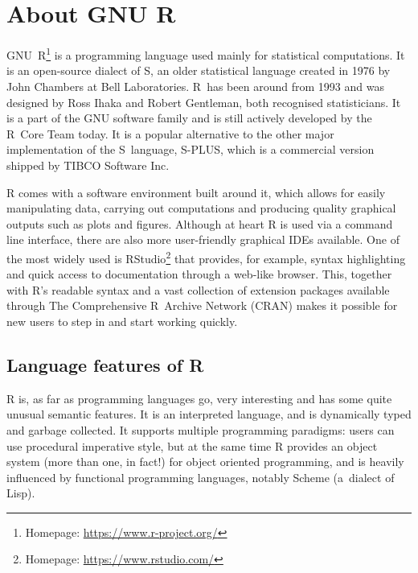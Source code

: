 \chapter{About GNU R\label{gnur}}

GNU~R\footnote{Homepage: \url{https://www.r-project.org/}} is a programming language used mainly for statistical computations. It is an open-source dialect of S, an older statistical language created in 1976 by John Chambers at Bell Laboratories. R~has been around from 1993 and was designed by Ross Ihaka and Robert Gentleman, both recognised statisticians. It is a part of the GNU software family and is still actively developed by the R~Core Team today. It is a popular alternative to the other major implementation of the S~language, S-PLUS, which is a commercial version shipped by TIBCO Software Inc.
\todo[cite]

R comes with a software environment built around it, which allows for easily manipulating data, carrying out computations and producing quality graphical outputs such as plots and figures. Although at heart R is used via a command line interface, there are also more user-friendly graphical IDEs available. One of the most widely used is RStudio\footnote{Homepage: \url{https://www.rstudio.com/}} that provides, for example, syntax highlighting and quick access to documentation through a web-like browser. This, together with R's readable syntax and a vast collection of extension packages available through The Comprehensive R~Archive Network (CRAN) makes it possible for new users to step in and start working quickly.


\section{Language features of R}



R is, as far as programming languages go, very interesting and has some quite unusual semantic features. It is an interpreted language, and is dynamically typed and garbage collected. It supports multiple programming paradigms: users can use procedural imperative style, but at the same time R provides an object system (more than one, in fact!) for object oriented programming, and is heavily influenced by functional programming languages, notably Scheme (a~dialect of Lisp).

